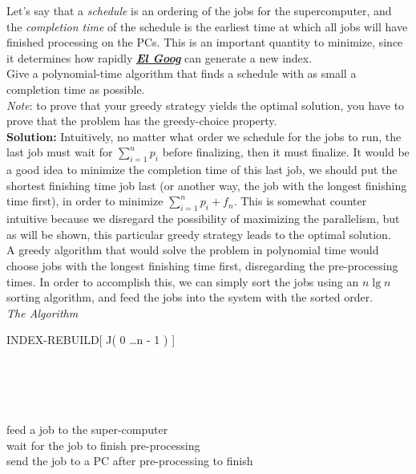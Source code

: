 \documentclass[11pts]{article}
\begin{document}
\begin{enumerate}
Let’s say that a \emph{schedule}
is an ordering of the jobs for the supercomputer, and the \emph{completion
time} of the schedule is the earliest time at which all jobs will have
finished processing on the PCs. This is an important quantity to minimize,
since it determines how rapidly \textbf{\textit{\underline{El Goog}}} can
generate a new index. \\

Give a polynomial-time algorithm that finds a schedule with as small a 
completion time as possible. \\

\textit{Note}: to prove that your greedy strategy yields the optimal
solution, you have to prove that the problem has the greedy-choice property. \\

  \textbf{Solution:} Intuitively, no matter what order we schedule for the
  jobs to run, the last job must wait for $\sum_{i=1}^{n}{p_i}$ before
  finalizing, then it must finalize. It would be a good idea to minimize
  the completion time of this last job, we should put the shortest finishing
  time job last (or another way, the job with the longest finishing time
  first), in order to minimize $\sum_{i=1}^{n}{p_i} + f_n$. This is somewhat
  counter intuitive because we disregard the possibility of maximizing the
  parallelism, but as will be shown, this particular greedy strategy leads
  to the optimal solution. \\

  A greedy algorithm that would solve the problem in
  polynomial time would choose jobs with the longest finishing time first,
  disregarding the pre-processing times. In order to accomplish this, we
  can simply sort the jobs using an $n\lg{n}$ sorting algorithm, and feed
  the jobs into the system with the sorted order. \\

  \textit{The Algorithm} \\
\begin{algorithm}{INDEX-REBUILD}[ J( 0 \dots n - 1 ) ]{
   }

   \\
   \\
   \\
  \do \\
    feed a job to the super-computer \\
    wait for the job to finish pre-processing \\
    send the job to a PC after pre-processing to finish
  \qrof \\
  \qstop {}
  

\end{algorithm}
\end{enumerate}
\end{document}
